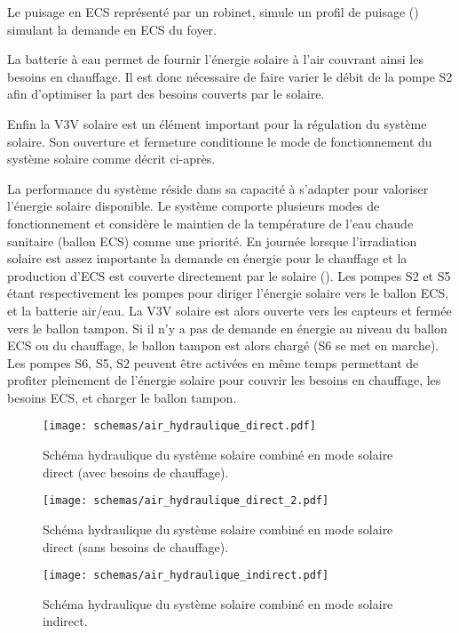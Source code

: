 Le puisage en ECS représenté par un robinet, simule un profil de puisage ()
simulant la demande en ECS du foyer.

La batterie à eau permet de fournir l’énergie solaire à l’air couvrant ainsi les besoins
en chauffage. Il est donc nécessaire de faire varier le débit de la pompe S2 afin d’optimiser
la part des besoins couverts par le solaire.

Enfin la V3V solaire est un élément important pour la régulation du système solaire. Son ouverture
et fermeture conditionne le mode de fonctionnement du système solaire comme décrit ci-après.

La performance du système réside dans sa capacité à s’adapter pour valoriser
l’énergie solaire disponible. Le système comporte plusieurs modes de fonctionnement
et considère le maintien de la température de l’eau chaude sanitaire (ballon ECS)
comme une priorité.
En journée lorsque l’irradiation solaire est assez importante la demande en énergie
pour le chauffage et la production d’ECS est couverte directement par le solaire
().
Les pompes S2 et S5 étant respectivement les pompes pour diriger l’énergie solaire
vers le ballon ECS, et la batterie air/eau.
La V3V solaire est alors ouverte vers les capteurs et fermée vers le ballon tampon.
Si il n’y a pas de demande en énergie au niveau du ballon ECS ou du chauffage, le ballon
tampon est alors chargé (S6 se met en marche). Les pompes S6, S5, S2 peuvent être activées
en même temps permettant de profiter pleinement de l’énergie solaire pour couvrir les
besoins en chauffage, les besoins ECS, et charger le ballon tampon.
\begin{figure}
    \begin{center}
        \texttt{[image: schemas/air\_hydraulique\_direct.pdf]}
    \end{center}
    \caption{Schéma hydraulique du système solaire combiné en mode solaire direct
             (avec besoins de chauffage).
             \label{fig:air_hydraulique_direct}}
\end{figure}
\begin{figure}
    \begin{center}
        \texttt{[image: schemas/air\_hydraulique\_direct\_2.pdf]}
    \end{center}
    \caption{Schéma hydraulique du système solaire combiné en mode solaire direct
             (sans besoins de chauffage).
             \label{fig:air_hydraulique_direct_2}}
\end{figure}
\begin{figure}
    \begin{center}
        \texttt{[image: schemas/air\_hydraulique\_indirect.pdf]}
    \end{center}
    \caption{Schéma hydraulique du système solaire combiné en mode solaire indirect.
             \label{fig:air_hydraulique_indirect}}
\end{figure}

